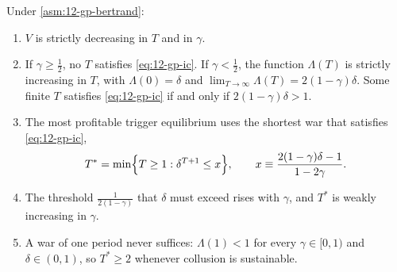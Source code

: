 \begin{corollary}\label{cor:12-gp-optimal-T}
Under \cref{asm:12-gp-bertrand}:
\begin{enumerate}[label=(\roman*)]
\item $V$ is strictly decreasing in $T$ and in $\gamma$.
\item If $\gamma \ge \frac{1}{2}$, no $T$ satisfies \eqref{eq:12-gp-ic}. If $\gamma < \frac{1}{2}$, the function
$\Lambda(T)$ is strictly increasing in $T$, with $\Lambda(0) = \delta$ and $\lim_{T \to \infty} \Lambda(T) = 2(1 - \gamma)\delta$.
Some finite $T$ satisfies \eqref{eq:12-gp-ic} if and only if $2(1 - \gamma)\delta > 1$.
\item The most profitable trigger equilibrium uses the shortest war that satisfies \eqref{eq:12-gp-ic},
\begin{equation}\label{eq:12-gp-Tstar}
T^* = \min\Bigl\{T \ge 1 : \delta^{T + 1} \le x\Bigr\},
\qquad
x \equiv \frac{2(1 - \gamma)\delta - 1}{1 - 2\gamma} .
\end{equation}
\item The threshold $\frac{1}{2(1 - \gamma)}$ that $\delta$ must exceed rises with $\gamma$, and $T^*$ is weakly
increasing in $\gamma$.
\item A war of one period never suffices: $\Lambda(1) < 1$ for every $\gamma \in [0, 1)$ and $\delta \in (0, 1)$, so
$T^* \ge 2$ whenever collusion is sustainable.
\end{enumerate}
\end{corollary}

